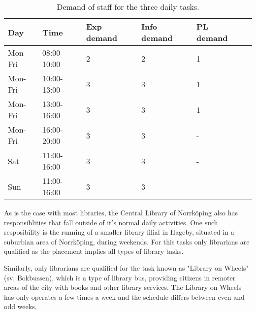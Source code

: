 \begin{table}[h]
\centering
\caption{Demand of staff for the three daily tasks.}
\label{tab:Outer_Task_Demand}
\begin{tabularx}{\textwidth}{|X|l|l|l|l|X|}
\hline
\textbf{Day} & \textbf{Time} & \textbf{Exp demand} & \textbf{Info demand} & \textbf{PL demand}
\\ \hline 
Mon-Fri & 08:00-10:00 & 2 & 2 & 1
\\ \hline 
Mon-Fri & 10:00-13:00 & 3 & 3 & 1
\\ \hline 
Mon-Fri & 13:00-16:00  & 3 & 3 & 1
\\ \hline 
Mon-Fri & 16:00-20:00 & 3 & 3 & -
\\ \hline 
Sat & 11:00-16:00  & 3 & 3 & -
\\ \hline 
Sun & 11:00-16:00  & 3 & 3 & -
\\ \hline 
\end{tabularx}
\end{table} 


As is the case with most libraries, the Central Library of Norrköping also has responsiblities that fall outside of it's normal daily activities. One such resposibility is the running of a smaller library filial in Hageby, situated in a suburbian area of Norrköping, during weekends. For this tasks only librarians are qualified as the placement implies all types of library tasks.

Similarly, only librarians are qualified for the task known as "Library on Wheels" (sv. Bokbussen), which is a type of library bus, providing citizens in remoter areas of the city with books and other library services. The Library on Wheels has only operates a few times a week and the schedule differs between even and odd weeks.

